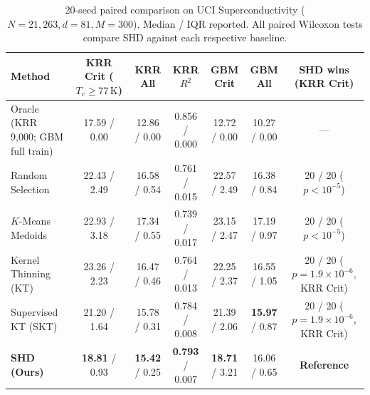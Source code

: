 \documentclass[11pt,a4paper]{article}
\begin{document}
\begin{table}[t]
\centering
\small
\caption{20-seed paired comparison on UCI Superconductivity ($N=21,263, d=81, M=300$). Median / IQR reported. All paired Wilcoxon tests compare SHD against each respective baseline.}
\label{tab:superconduct}
\begin{tabular}{lcccccc}
\toprule
\textbf{Method} & \textbf{KRR Crit ($T_c \ge 77\,\mathrm{K}$)} & \textbf{KRR All} & \textbf{KRR $R^2$} & \textbf{GBM Crit} & \textbf{GBM All} & \textbf{SHD wins (KRR Crit)} \\
\midrule
Oracle (KRR 9,000; GBM full train) & 17.59 / 0.00 & 12.86 / 0.00 & 0.856 / 0.000 & 12.72 / 0.00 & 10.27 / 0.00 & --- \\
\midrule
Random Selection & 22.43 / 2.49 & 16.58 / 0.54 & 0.761 / 0.015 & 22.57 / 2.49 & 16.38 / 0.84 & 20 / 20 ($p < 10^{-5}$) \\
$K$-Means Medoids & 22.93 / 3.18 & 17.34 / 0.55 & 0.739 / 0.017 & 23.15 / 2.47 & 17.19 / 0.97 & 20 / 20 ($p < 10^{-5}$) \\
Kernel Thinning (KT) & 23.26 / 2.23 & 16.47 / 0.46 & 0.764 / 0.013 & 22.25 / 2.37 & 16.55 / 1.05 & 20 / 20 ($p = 1.9 \times 10^{-6}$, KRR Crit) \\
Supervised KT (SKT) & 21.20 / 1.64 & 15.78 / 0.31 & 0.784 / 0.008 & 21.39 / 2.06 & \textbf{15.97} / 0.87 & 20 / 20 ($p = 1.9 \times 10^{-6}$, KRR Crit) \\
\midrule
\textbf{SHD (Ours)} & \textbf{18.81} / 0.93 & \textbf{15.42} / 0.25 & \textbf{0.793} / 0.007 & \textbf{18.71} / 3.21 & 16.06 / 0.65 & \textbf{Reference} \\
\bottomrule
\end{tabular}
\end{table}
\end{document}
